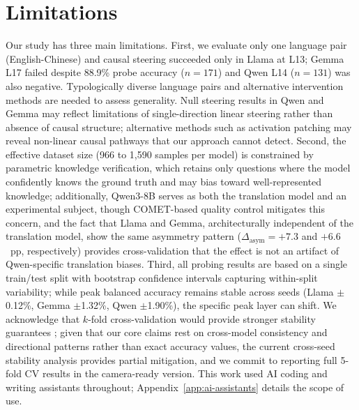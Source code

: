 \section*{Limitations}
\label{sec:limitations}

Our study has three main limitations.
First, we evaluate only one language pair (English-Chinese) and causal steering succeeded only in Llama at L13; Gemma L17 failed despite 88.9\% probe accuracy ($n = 171$) and Qwen L14 ($n = 131$) was also negative.
Typologically diverse language pairs and alternative intervention methods are needed to assess generality.
Null steering results in Qwen and Gemma may reflect limitations of single-direction linear steering rather than absence of causal structure; alternative methods such as activation patching \citep{meng2022locating} may reveal non-linear causal pathways that our approach cannot detect.
Second, the effective dataset size (966 to 1,590 samples per model) is constrained by parametric knowledge verification, which retains only questions where the model confidently knows the ground truth and may bias toward well-represented knowledge; additionally, Qwen3-8B serves as both the translation model and an experimental subject, though COMET-based quality control mitigates this concern, and the fact that Llama and Gemma, architecturally independent of the translation model, show the same asymmetry pattern ($\Delta_{\text{asym}} = +7.3$ and $+6.6$~pp, respectively) provides cross-validation that the effect is not an artifact of Qwen-specific translation biases.
Third, all probing results are based on a single train/test split with bootstrap confidence intervals capturing within-split variability; while peak balanced accuracy remains stable across seeds (Llama $\pm$0.12\%, Gemma $\pm$1.32\%, Qwen $\pm$1.90\%), the specific peak layer can shift.
We acknowledge that $k$-fold cross-validation would provide stronger stability guarantees \citep{belinkov2022probing}; given that our core claims rest on cross-model consistency and directional patterns rather than exact accuracy values, the current cross-seed stability analysis provides partial mitigation, and we commit to reporting full 5-fold CV results in the camera-ready version.
This work used AI coding and writing assistants throughout; Appendix~\ref{app:ai-assistants} details the scope of use.

